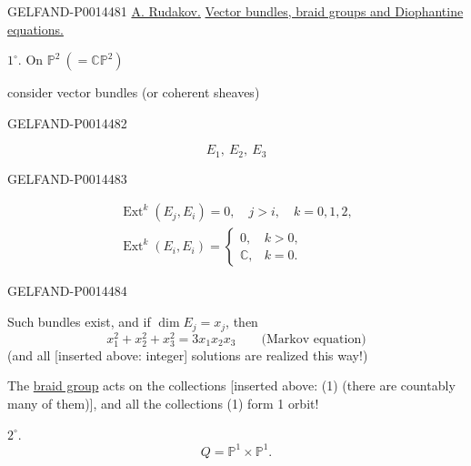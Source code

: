\begin{GelfandAdjacentEvidence}{GELFAND-P001448}{1}
\uline{A. Rudakov.}\quad
\uline{Vector bundles, braid groups and Diophantine equations.}

\(1^{\circ}\). On \(\mathbb{P}^{2}\ (= \mathbb{C}\mathbb{P}^{2})\)

consider vector bundles (or coherent sheaves)
\end{GelfandAdjacentEvidence}
\begin{GelfandAdjacentEvidence}{GELFAND-P001448}{2}

\begin{equation*}
E_1,\ E_2,\ E_3 \tag{1}
\end{equation*}
\end{GelfandAdjacentEvidence}
\begin{GelfandAdjacentEvidence}{GELFAND-P001448}{3}

\begin{equation*}
\begin{gathered}
\operatorname{Ext}^{k}(E_j,E_i)=0,\quad j>i,\quad k=0,1,2,\\
\operatorname{Ext}^{k}(E_i,E_i)=
\begin{cases}
0,& k>0,\\
\mathbb{C},& k=0.
\end{cases}
\end{gathered}
\tag{2}
\end{equation*}
\end{GelfandAdjacentEvidence}
\begin{GelfandAdjacentEvidence}{GELFAND-P001448}{4}


Such bundles exist, and if \(\dim E_j=x_j\), then
\begin{equation*}
x_1^2+x_2^2+x_3^2=3x_1x_2x_3
\qquad\text{(Markov equation)} \tag{3}
\end{equation*}
(and all [inserted above: integer] solutions are realized this way!)

The \uline{braid group} acts on the collections [inserted above: (1) (there are countably many of them)], and all the collections (1) form 1 orbit!

\(2^{\circ}\).
\begin{equation*}
Q=\mathbb{P}^{1}\times\mathbb{P}^{1}.
\end{equation*}
\end{GelfandAdjacentEvidence}
